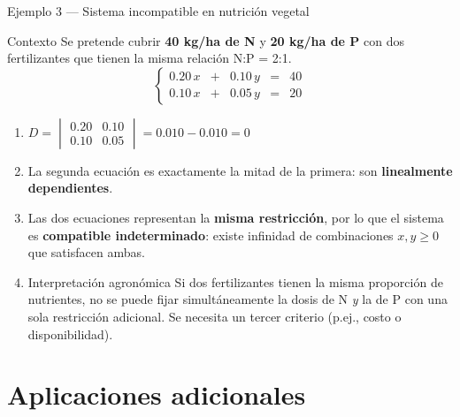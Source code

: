 \documentclass[11pt, aspectratio=169]{beamer}
\newcommand{\deter}[4]{\begin{vmatrix} #1 & #2 \\ #3 & #4 \end{vmatrix}}
\begin{document}
\begin{frame}{Ejemplo 3 — Sistema incompatible en nutrición vegetal}
  \begin{exampleblock}{Contexto}
    Se pretende cubrir \textbf{40 kg/ha de N} y \textbf{20 kg/ha de P} con dos
    fertilizantes que tienen la misma relación N:P = 2:1.
    \[
      \left\{
      \begin{array}{rcrcr}
        0.20\,x & + & 0.10\,y & = & 40\\[4pt]
        0.10\,x & + & 0.05\,y & = & 20
      \end{array}
      \right.
    \]
  \end{exampleblock}

  \begin{enumerate}
    \item<2-> $D = \deter{0.20}{0.10}{0.10}{0.05} = 0.010 - 0.010 = 0$
    \item<3-> La segunda ecuación es exactamente la mitad de la primera:
      son \textbf{linealmente dependientes}.
    \item<4-> Las dos ecuaciones representan la \textbf{misma restricción},
      por lo que el sistema es \textbf{compatible indeterminado}:
      existe infinidad de combinaciones $x, y \geq 0$ que satisfacen ambas.
    \item<5->
      \begin{alertblock}{Interpretación agronómica}
        Si dos fertilizantes tienen la misma proporción de nutrientes,
        no se puede fijar simultáneamente la dosis de N \textit{y} la de P
        con una sola restricción adicional. Se necesita un tercer criterio
        (p.ej., costo o disponibilidad).
      \end{alertblock}
  \end{enumerate}
\end{frame}

\section{Aplicaciones adicionales}
\end{document}
